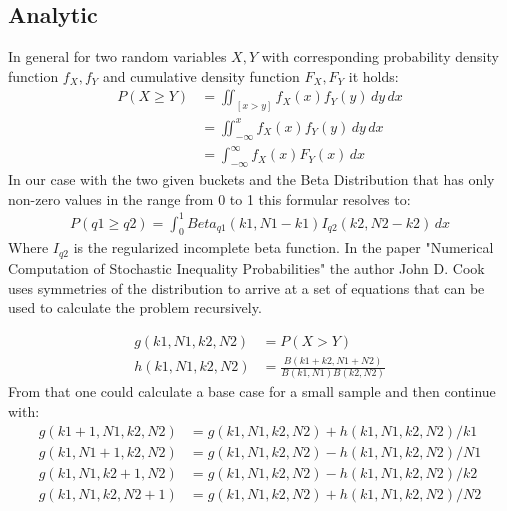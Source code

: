 \documentclass[../Thesis.tex]{subfiles}
\begin{document}
\subsection{Analytic}
In general for two random variables $X,Y$ with corresponding probability density function $f_X,f_Y$ and cumulative density function $F_X,F_Y$ it holds: 
\begin{align*}
P(X \geq Y ) &= \iint_{[x>y]} f_X(x)f_Y(y) \,dy\,dx \\
			 &= \iint_{-\infty}^{x} f_X(x)f_Y(y) \,dy\,dx \\
			 &= \int_{-\infty}^{\infty}f_X(x)F_Y(x)\,dx
\end{align*}
In our case with the two given buckets and the Beta Distribution that has only non-zero values in the range from 0 to 1 this formular resolves to:
\begin{align*}
P(q1 \geq q2 ) = \int_{0}^{1}Beta_{q1}(k1,N1-k1)I_{q2}(k2,N2-k2)\,dx
\end{align*}
Where $I_{q2}$ is the regularized incomplete beta function.
In the paper "Numerical Computation of Stochastic Inequality Probabilities" the author John D. Cook uses symmetries of the distribution to arrive at a set of equations that can be used to calculate the problem recursively.

\begin{align*}
g(k1,N1,k2,N2) &= P(X>Y) \\
h(k1,N1,k2,N2) &= \frac{B(k1+k2,N1+N2)}{B(k1,N1)B(k2,N2)}
\end{align*}
From that one could calculate a base case for a small sample and then continue with:
\begin{align*}
g(k1 + 1,N1,k2,N2) &= g(k1,N1,k2,N2) + h(k1,N1,k2,N2)/k1 \\
g(k1,N1 + 1,k2,N2) &= g(k1,N1,k2,N2) - h(k1,N1,k2,N2)/N1 \\
g(k1,N1,k2 + 1,N2) &= g(k1,N1,k2,N2) - h(k1,N1,k2,N2)/k2 \\
g(k1,N1,k2,N2 + 1) &= g(k1,N1,k2,N2) + h(k1,N1,k2,N2)/N2 \\
\end{align*}
\end{document}
